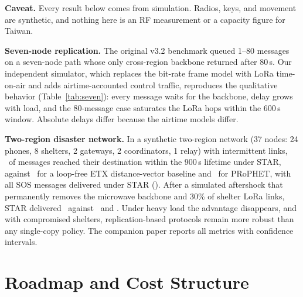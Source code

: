 \documentclass[jou,a4paper,11pt,floatsintext]{apa7}
\begin{document}
\textbf{Caveat.} Every result below comes from simulation. Radios, keys, and movement are synthetic, and nothing here is an RF measurement or a capacity figure for Taiwan.



\textbf{Seven-node replication.} The original v3.2 benchmark queued 1--80 messages on a seven-node path whose only cross-region backbone returned after 80\,s. Our independent simulator, which replaces the bit-rate frame model with LoRa time-on-air and adds airtime-accounted control traffic, reproduces the qualitative behavior (Table~\ref{tab:seven}): every message waits for the backbone, delay grows with load, and the 80-message case saturates the LoRa hops within the 600\,s window. Absolute delays differ because the airtime models differ.

\textbf{Two-region disaster network.} In a synthetic two-region network (37 nodes: 24 phones, 8 shelters, 2 gateways, 2 coordinators, 1 relay) with intermittent links, \STARmainPDR\ of messages reached their destination within the 900\,s lifetime under STAR, against \ETXmainPDR\ for a loop-free ETX distance-vector baseline and \PROmainPDR\ for PRoPHET, with all SOS messages delivered under STAR (\STARmainSOS). After a simulated aftershock that permanently removes the microwave backbone and 30\% of shelter LoRa links, STAR delivered \STARafterPDR\ against \ETXafterPDR\ and \PROafterPDR. Under heavy load the advantage disappears, and with compromised shelters, replication-based protocols remain more robust than any single-copy policy. The companion paper reports all metrics with confidence intervals.

\section{Roadmap and Cost Structure}
\label{sec:roadmap}
\end{document}
